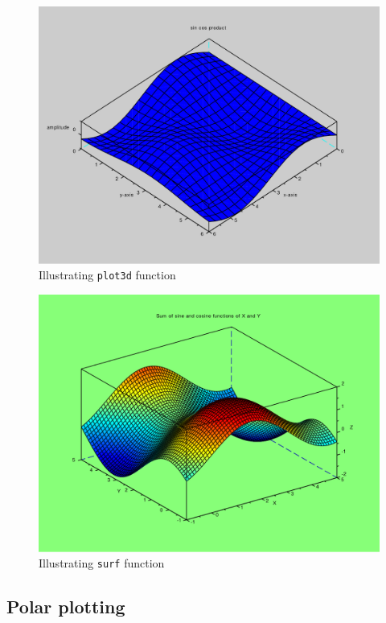 \begin{figure}
\includegraphics[scale=.5]{scilabCode/plot3dsin.pdf}
\caption{Illustrating \texttt{plot3d} function }
\label{plot3dsin}
\end{figure}

\begin{figure}
\includegraphics[scale=.5]{scilabCode/surfaceplot.pdf}
\caption{Illustrating \texttt{surf} function}
\label{surf}
\end{figure}
\newpage


\subsection*{Polar plotting}


